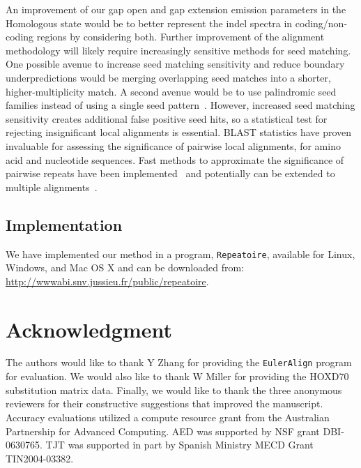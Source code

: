 \documentclass[12pt,journal,letterpaper,onecolumn, draftcls]{IEEEtran}
\begin{document}
An improvement of our gap open and gap extension emission parameters in the Homologous state would be to better represent the indel spectra in coding/non-coding regions by considering both. Further improvement of the alignment methodology will likely require increasingly sensitive methods for
seed matching. One possible avenue to increase seed matching sensitivity and reduce boundary underpredictions would be merging overlapping seed matches into a
shorter, higher-multiplicity match.  A second avenue would be to use palindromic seed families instead of using a single seed pattern~\cite{ref-pattern}. However, increased seed matching sensitivity creates additional
false positive seed hits, so a statistical test for rejecting
insignificant local alignments is essential.  BLAST statistics have proven
invaluable for assessing the significance of pairwise local alignments, for amino acid and nucleotide sequences.
Fast methods to approximate the significance of pairwise
repeats have been implemented~\cite{repseek} and potentially can be
extended to multiple alignments~\cite{ref-related1, Prakash2005}.

\subsection*{Implementation}
We have implemented our method in a program, \texttt{Repeatoire},
available for Linux, Windows, and Mac OS X and can be downloaded from:
\url{http://wwwabi.snv.jussieu.fr/public/repeatoire}. 

\section{ Acknowledgment }
The authors would like to thank Y Zhang for providing the
\texttt{EulerAlign} program for evaluation. We would also like to thank
W Miller for providing the HOXD70 substitution matrix data.  Finally, we would like to thank the three anonymous reviewers for their constructive suggestions that improved the manuscript. Accuracy evaluations utilized a compute resource grant from the Australian
Partnership for Advanced Computing.  AED was supported by NSF grant
DBI-0630765. TJT was supported in part by Spanish Ministry MECD Grant
TIN2004-03382.

\end{document}
